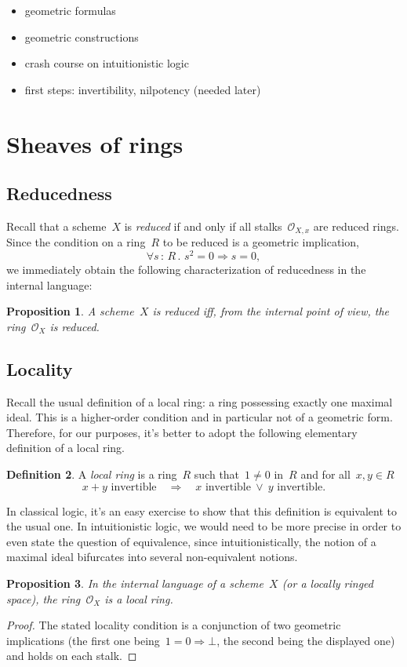 \documentclass[10pt]{amsart}
\theoremstyle{definition}
\newtheorem{defn}{Definition}[section]
\theoremstyle{plain}
\newtheorem{prop}[defn]{Proposition}
\theoremstyle{remark}
\renewcommand{\O}{\mathcal{O}}
\newcommand{\?}{\,{:}\,}
\renewcommand{\_}{\mathpunct{.}\,}
\begin{document}
\begin{itemize}
\item geometric formulas
\item geometric constructions
\item crash course on intuitionistic logic
\item first steps: invertibility, nilpotency (needed later)
\end{itemize}


\section{Sheaves of rings}

\subsection{Reducedness} Recall that a scheme~$X$ is \emph{reduced} if and only
if all stalks~$\O_{X,x}$ are reduced rings. Since the condition on a ring~$R$
to be reduced is a geometric implication,
\[ \forall s\?R\_ s^2 = 0 \Longrightarrow s = 0, \]
we immediately obtain the following characterization of reducedness in the
internal language:
\begin{prop}A scheme~$X$ is reduced iff, from the internal point of view, the
ring~$\O_X$ is reduced.\end{prop}


\subsection{Locality} Recall the usual definition of a local ring: a ring
possessing exactly one maximal ideal. This is a higher-order condition and in
particular not of a geometric form. Therefore, for our purposes, it's better to
adopt the following elementary definition of a local ring.
\begin{defn}A \emph{local ring} is a ring~$R$ such that~$1 \neq 0$ in~$R$ and
for all~$x,y \in R$
\[ \text{$x+y$ invertible} \quad\Longrightarrow\quad
  \text{$x$ invertible}\ \vee\ \text{$y$ invertible}. \]
\end{defn}
In classical logic, it's an easy exercise to show that this definition is
equivalent to the usual one. In intuitionistic logic, we would need to be
more precise in order to even state the question of equivalence, since
intuitionistically, the notion of a maximal ideal bifurcates into several
non-equivalent notions.

\begin{prop}In the internal language of a scheme~$X$ (or a locally ringed
space), the ring~$\O_X$ is a local ring.\end{prop}
\begin{proof}The stated locality condition is a conjunction of two geometric
implications (the first one being~$1 = 0 \Rightarrow \bot$, the second being
the displayed one) and holds on each stalk.\end{proof}
\end{document}

